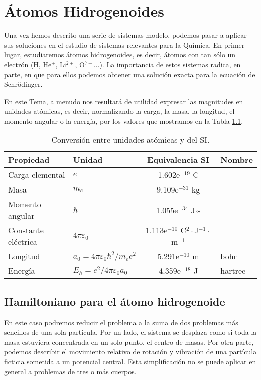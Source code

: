 \chapter{Átomos Hidrogenoides}
Una vez hemos descrito una serie de sistemas modelo, podemos
pasar a aplicar sus soluciones en el estudio de sistemas
relevantes para la Química. En primer lugar, estudiaremos 
átomos hidrogenoides, es decir, átomos con tan sólo un
electrón (H, He$^+$, Li$^{2+}$, O$^{7+}$...). La importancia
de estos sistemas radica, en parte, en que para ellos
podemos obtener una solución exacta para la ecuación de
Schrödinger.

En este Tema, a menudo nos resultará de utilidad expresar las 
magnitudes en unidades atómicas, es decir, normalizando la carga, 
la masa, la longitud, el momento angular o la energía, por los 
valores que mostramos en la Tabla \ref{tb:au}.

\begin{table}[h!]
    \centering
    \small{}
    \begin{tabular}{|l|l|c|l|}
    \hline
         Propiedad & Unidad & Equivalencia SI& Nombre  \\
    \hline
    \hline
         Carga elemental & $e$ & 1.602e$^{-19}$ C & \\ 
         Masa & $m_e$ & 9.109e$^{-31}$ kg & \\ 
         Momento angular & $\hbar$ & 1.055e$^{-34}$ J$\cdot$s & \\ 
         Constante eléctrica & $4\pi \varepsilon_0$ & 1.113e$^{-10}$ C$^2\cdot$J$^{-1}\cdot$m$^{-1}$ \\
         Longitud & $a_0=4\pi \varepsilon_0\hbar^2/m_ee^2$ & 5.291e$^{-10}$ m & bohr \\ 
         Energía & $E_h=e^2/4\pi \varepsilon_0a_0$  & 4.359e$^{-18}$ J & hartree \\ 
    \hline
    \end{tabular}
    \caption{Conversión entre unidades atómicas y del SI.}
    \label{tb:au}
\end{table}

\section{Hamiltoniano para el átomo hidrogenoide}
En este caso podremos reducir el problema a la suma de dos problemas 
más sencillos de una sola partícula. Por un lado, el sistema se 
desplaza como si toda la masa estuviera concentrada en un solo punto,
el centro de masas. Por otra parte, podemos describir el movimiento 
relativo de rotación y vibración de una partícula ficticia sometida 
a un potencial central. Esta simplificación no se puede aplicar en 
general a problemas de tres o más cuerpos.

